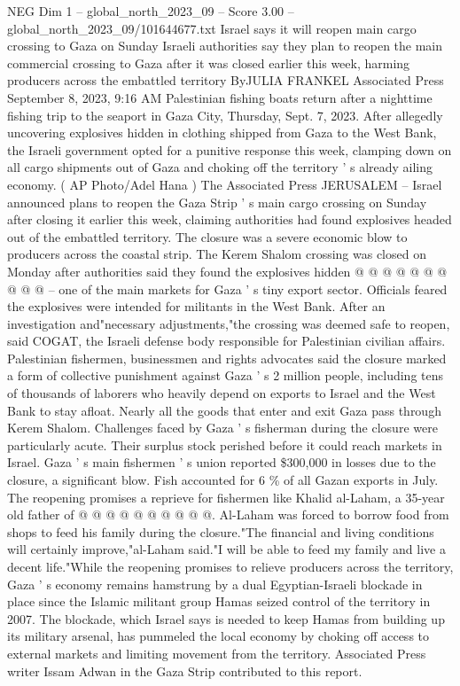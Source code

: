 \begin{textsample}{NEG Dim 1 – global\_north\_2023\_09 – Score 3.00 – global\_north\_2023\_09/101644677.txt}  \label{ex:f1_neg_341}
Israel says it will reopen main cargo crossing to Gaza on Sunday Israeli authorities say they plan to reopen the main commercial crossing to Gaza after it was closed earlier this week, harming producers across the embattled territory ByJULIA FRANKEL Associated Press September 8, 2023, 9:16 AM Palestinian fishing boats return after a nighttime fishing trip to the seaport in Gaza City, Thursday, Sept. 7, 2023.
After allegedly uncovering explosives hidden in clothing shipped from Gaza to the West Bank, the Israeli government opted for a punitive response this week, clamping down on all cargo shipments out of Gaza and choking off the territory ' s already ailing economy. ( AP Photo/Adel Hana ) The Associated Press JERUSALEM -- Israel announced plans to reopen the Gaza Strip ' s main cargo crossing on Sunday after closing it earlier this week, claiming authorities had found explosives headed out of the embattled territory.
The closure was a severe economic blow to producers across the coastal strip.
The Kerem Shalom crossing was closed on Monday after authorities said they found the explosives hidden @ @ @ @ @ @ @ @ @ @ -- one of the main markets for Gaza ' s tiny export sector.
Officials feared the explosives were intended for militants in the West Bank.
After an investigation and"necessary adjustments,"the crossing was deemed safe to reopen, said COGAT, the Israeli defense body responsible for Palestinian civilian affairs.
Palestinian fishermen, businessmen and rights advocates said the closure marked a form of collective punishment against Gaza ' s 2 million people, including tens of thousands of laborers who heavily depend on exports to Israel and the West Bank to stay afloat.
Nearly all the goods that enter and exit Gaza pass through Kerem Shalom.
Challenges faced by Gaza ' s fisherman during the closure were particularly acute.
Their surplus stock perished before it could reach markets in Israel.
Gaza ' s main fishermen ' s union reported \$300,000 in losses due to the closure, a significant blow.
Fish accounted for 6 \% of all Gazan exports in July.
The reopening promises a reprieve for fishermen like Khalid al-Laham, a 35-year old father of @ @ @ @ @ @ @ @ @ @.
Al-Laham was forced to borrow food from shops to feed his family during the closure."The financial and living conditions will certainly improve,"al-Laham said."I will be able to feed my family and live a decent life."While the reopening promises to relieve producers across the territory, Gaza ' s economy remains hamstrung by a dual Egyptian-Israeli blockade in place since the Islamic militant group Hamas seized control of the territory in 2007.
The blockade, which Israel says is needed to keep Hamas from building up its military arsenal, has pummeled the local economy by choking off access to external markets and limiting movement from the territory.
Associated Press writer Issam Adwan in the Gaza Strip contributed to this report.

\end{textsample}
